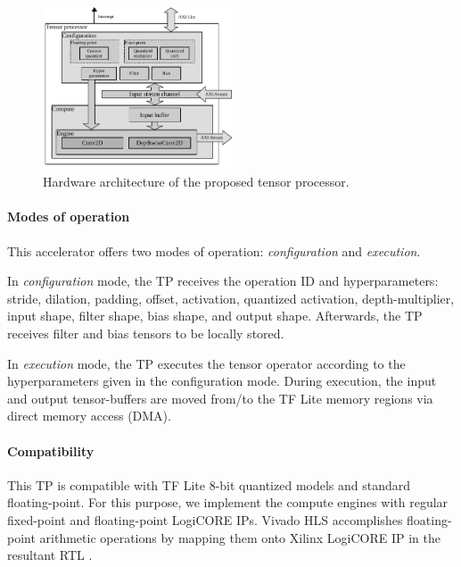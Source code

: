 \begin{figure}[t!]
	\centering
	\includegraphics[width=0.5\textwidth]{../figures/accelerator.pdf}
	\caption{Hardware architecture of the proposed tensor processor.}
	\label{fig:accelerator}
\end{figure}

\paragraph{\textbf{Modes of operation}} This accelerator offers two modes of operation: \emph{configuration} and \emph{execution}.

In \emph{configuration} mode, the TP receives the operation ID and hyperparameters: stride, dilation, padding, offset, activation, quantized activation, depth-multiplier, input shape, filter shape, bias shape, and output shape. Afterwards, the TP receives filter and bias tensors to be locally stored.

In \emph{execution} mode, the TP executes the tensor operator according to the hyperparameters given in the configuration mode. During execution, the input and output tensor-buffers are moved from/to the TF Lite memory regions via direct memory access (DMA).

\paragraph{\textbf{Compatibility}}

 This TP is compatible with TF Lite 8-bit quantized models and standard floating-point. For this purpose, we implement the compute engines with regular fixed-point and floating-point LogiCORE IPs.
 Vivado HLS accomplishes floating-point arithmetic operations by mapping
 them onto Xilinx LogiCORE IP in the resultant RTL \cite{hrica2012floating}.
 
